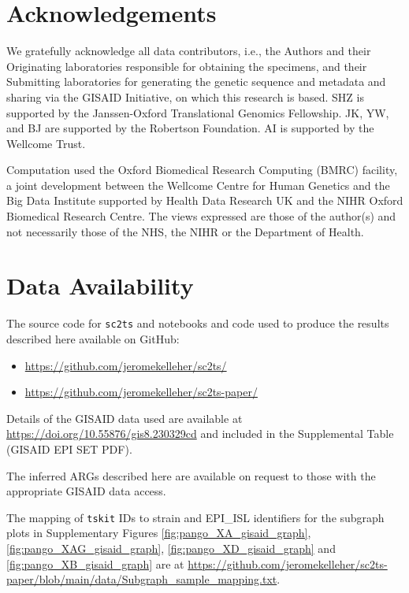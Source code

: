 \documentclass{article}
\begin{document}
\section{Acknowledgements}
We gratefully acknowledge all data contributors, i.e., the Authors and their
Originating laboratories responsible for obtaining the specimens, and their
Submitting laboratories for generating the genetic sequence and metadata and
sharing via the GISAID Initiative, on which this research is based.
SHZ is supported by the Janssen-Oxford Translational Genomics Fellowship. JK,
YW, and BJ are supported by the Robertson Foundation. AI is supported by the Wellcome Trust.

Computation used the Oxford Biomedical Research Computing (BMRC) facility, a
joint development between the Wellcome Centre for Human Genetics and the Big
Data Institute supported by Health Data Research UK and the NIHR Oxford
Biomedical Research Centre. The views expressed are those of the author(s) and
not necessarily those of the NHS, the NIHR or the Department of Health.

\section{Data Availability}
\label{sec-data-availability}
The source code for \texttt{sc2ts} and notebooks and code used to produce the
results described here available on GitHub:
\begin{itemize}
\item \url{https://github.com/jeromekelleher/sc2ts/}
\item \url{https://github.com/jeromekelleher/sc2ts-paper/}
\end{itemize}

Details of the GISAID data used are available at
\url{https://doi.org/10.55876/gis8.230329cd} and included in the
Supplemental Table (GISAID EPI SET PDF).

The inferred ARGs described here are available on request to those with
the appropriate GISAID data access.

The mapping of \texttt{tskit} IDs to strain and EPI\_ISL identifiers for the
subgraph plots in Supplementary Figures \ref{fig:pango_XA_gisaid_graph}, \ref{fig:pango_XAG_gisaid_graph}, \ref{fig:pango_XD_gisaid_graph} and \ref{fig:pango_XB_gisaid_graph} are at
\url{https://github.com/jeromekelleher/sc2ts-paper/blob/main/data/Subgraph_sample_mapping.txt}.
\end{document}
